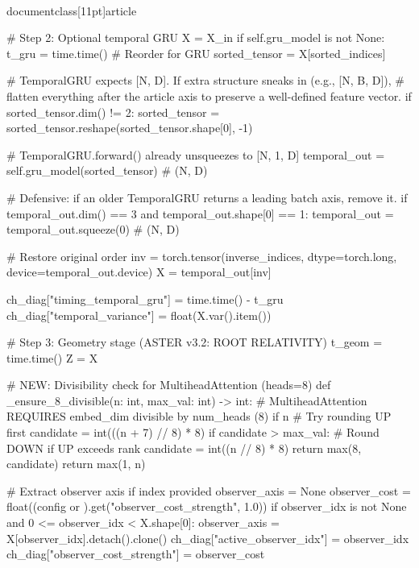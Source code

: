 \\documentclass[11pt]{article}
\begin{document}
\begin{CodeBlock}
            # Step 2: Optional temporal GRU
            X = X_in
            if self.gru_model is not None:
                t_gru = time.time()
                # Reorder for GRU
                sorted_tensor = X[sorted_indices]

                # TemporalGRU expects [N, D]. If extra structure sneaks in (e.g., [N, B, D]),
                # flatten everything after the article axis to preserve a well-defined feature vector.
                if sorted_tensor.dim() != 2:
                    sorted_tensor = sorted_tensor.reshape(sorted_tensor.shape[0], -1)

                # TemporalGRU.forward() already unsqueezes to [N, 1, D]
                temporal_out = self.gru_model(sorted_tensor)  # (N, D)

                # Defensive: if an older TemporalGRU returns a leading batch axis, remove it.
                if temporal_out.dim() == 3 and temporal_out.shape[0] == 1:
                    temporal_out = temporal_out.squeeze(0)  # (N, D)

                # Restore original order
                inv = torch.tensor(inverse_indices, dtype=torch.long, device=temporal_out.device)
                X = temporal_out[inv]

                ch_diag["timing_temporal_gru"] = time.time() - t_gru
                ch_diag["temporal_variance"] = float(X.var().item())

            # Step 3: Geometry stage (ASTER v3.2: ROOT RELATIVITY)
            t_geom = time.time()
            Z = X
            
            # NEW: Divisibility check for MultiheadAttention (heads=8)
            def _ensure_8_divisible(n: int, max_val: int) -> int:
                # MultiheadAttention REQUIRES embed_dim divisible by num_heads (8)
                if n %
                    # Try rounding UP first
                    candidate = int(((n + 7) // 8) * 8)
                    if candidate > max_val:
                        # Round DOWN if UP exceeds rank
                        candidate = int((n // 8) * 8)
                    return max(8, candidate)
                return max(1, n)

            # Extract observer axis if index provided
            observer_axis = None
            observer_cost = float((config or {}).get("observer_cost_strength", 1.0))
            if observer_idx is not None and 0 <= observer_idx < X.shape[0]:
                observer_axis = X[observer_idx].detach().clone()
                ch_diag["active_observer_idx"] = observer_idx
                ch_diag["observer_cost_strength"] = observer_cost


\end{CodeBlock}
\end{document}
